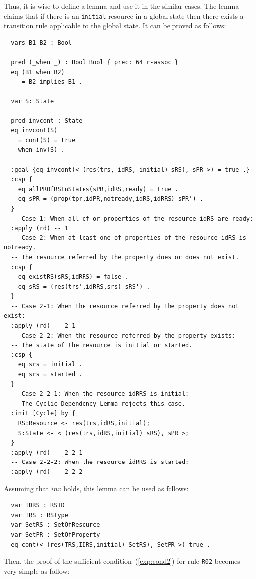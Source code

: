 \documentclass[12pt]{report}
\begin{document}
Thus, it is wise to define a lemma and use it in the similar cases.
The lemma claims that if there is an {\tt initial} resource in a
global state then there exists a transition rule applicable to the
global state. It can be proved as follows:
\begin{verbatim}
  vars B1 B2 : Bool

  pred (_when _) : Bool Bool { prec: 64 r-assoc }
  eq (B1 when B2)
     = B2 implies B1 .

  var S: State

  pred invcont : State
  eq invcont(S) 
    = cont(S) = true
    when inv(S) .

  :goal {eq invcont(< (res(trs, idRS, initial) sRS), sPR >) = true .}
  :csp { 
    eq allPROfRSInStates(sPR,idRS,ready) = true .
    eq sPR = (prop(tpr,idPR,notready,idRS,idRRS) sPR') .
  }
  -- Case 1: When all of or properties of the resource idRS are ready:
  :apply (rd) -- 1
  -- Case 2: When at least one of properties of the resource idRS is notready.
  -- The resource referred by the property does or does not exist.
  :csp {
    eq existRS(sRS,idRRS) = false .
    eq sRS = (res(trs',idRRS,srs) sRS') .
  }
  -- Case 2-1: When the resource referred by the property does not exist:
  :apply (rd) -- 2-1
  -- Case 2-2: When the resource referred by the property exists:
  -- The state of the resource is initial or started.
  :csp { 
    eq srs = initial .
    eq srs = started .
  }
  -- Case 2-2-1: When the resource idRRS is initial:
  -- The Cyclic Dependency Lemma rejects this case.
  :init [Cycle] by {
    RS:Resource <- res(trs,idRS,initial);
    S:State <- < (res(trs,idRS,initial) sRS), sPR >;
  }
  :apply (rd) -- 2-2-1
  -- Case 2-2-2: When the resource idRRS is started:
  :apply (rd) -- 2-2-2
\end{verbatim}
Assuming that $inv$ holds, this lemma can be used as follows:
\begin{verbatim}
  var IDRS : RSID 
  var TRS : RSType
  var SetRS : SetOfResource
  var SetPR : SetOfProperty
  eq cont(< (res(TRS,IDRS,initial) SetRS), SetPR >) true .
\end{verbatim}
Then, the proof of the sufficient condition~(\ref{exp:cond2}) for rule
{\tt R02} becomes very simple as follow:
\end{document}
